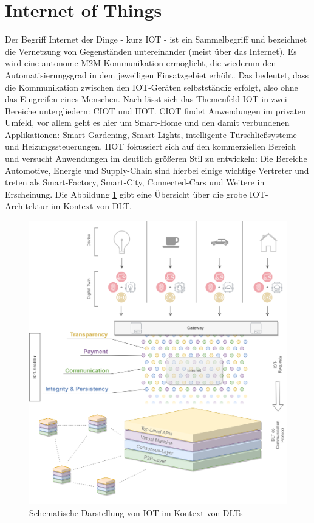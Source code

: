\section{Internet of Things}
\label{sec:fundamentals:iot}
Der Begriff Internet der Dinge - kurz \ac{IOT} - ist ein Sammelbegriff und bezeichnet die Vernetzung von Gegenständen untereinander (meist über das Internet). Es wird eine autonome \ac{M2M}-Kommunikation ermöglicht, die wiederum den Automatisierungsgrad in dem jeweiligen Einsatzgebiet erhöht. Das bedeutet, dass die Kommunikation zwischen den \ac{IOT}-Geräten selbstständig erfolgt, also ohne das Eingreifen eines Menschen. Nach \cite{deloitte2018} lässt sich das Themenfeld \ac{IOT} in zwei Bereiche untergliedern: \ac{CIOT} und \ac{IIOT}. \ac{CIOT} findet Anwendungen im privaten Umfeld, vor allem geht es hier um Smart-Home und den damit verbundenen Applikationen: Smart-Gardening, Smart-Lights, intelligente Türschließsysteme und Heizungssteuerungen. \ac{IIOT} fokussiert sich auf den kommerziellen Bereich und versucht Anwendungen im deutlich größeren Stil zu entwickeln: Die Bereiche Automotive, Energie und Supply-Chain sind hierbei einige wichtige Vertreter und treten als Smart-Factory, Smart-City, Connected-Cars und Weitere in Erscheinung. Die Abbildung \ref{fig:chapter02:overview-iot} gibt eine Übersicht über die grobe \ac{IOT}-Architektur im Kontext von \ac{DLT}.

\begin{figure}[h]
 \centering
 \includegraphics[width=1.0\textwidth]{gfx/Overview-IOT.png}
 \caption{Schematische Darstellung von IOT im Kontext von DLTs}
 \label{fig:chapter02:overview-iot}
\end{figure}

